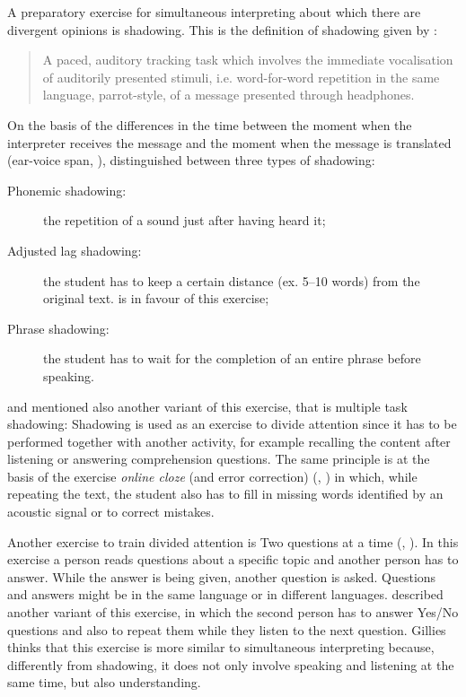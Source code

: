 \documentclass[output=paper]{../langscibook}
\begin{document}
A preparatory exercise for simultaneous interpreting about which there are divergent opinions is shadowing. This is the definition of shadowing given by \citet{Lambert1988}:

\begin{quote}
A paced, auditory tracking task which involves the immediate vocalisation of auditorily presented stimuli, i.e. word-for-word repetition in the same language, parrot-style, of a message presented through headphones. \citep[381]{Lambert1988}
\end{quote}

On the basis of the differences in the time between the moment when the interpreter receives the message and the moment when the message is translated (ear-voice span, \citealt{Goldman-Eisler1972}), \citet{AndresBodenFuchs2015} distinguished between three types of shadowing:

\begin{description}
\item[Phonemic shadowing:] the repetition of a sound just after having heard it;
\item[Adjusted lag shadowing:] \sloppy the student has to keep a certain distance (ex. 5--10 words) from the original text. \citet{PadillaBenitez2002} is in favour of this exercise;
\item[Phrase shadowing:] the student has to wait for the completion of an entire phrase before speaking.
\end{description}

\citet{Schewda_Nicholson1990} and \citet{TonelliRiccardi1995} mentioned also another variant of this exercise, that is multiple task shadowing: Shadowing is used as an exercise to divide attention since it has to be performed together with another activity, for example recalling the content after listening or answering comprehension questions. The same principle is at the basis of the exercise \emph{online cloze} (and error correction) (\citealt{Kalina1992}, \citealt{SettonDawrant2016b}) in which, while repeating the text, the student also has to fill in missing words identified by an acoustic signal or to correct mistakes.

Another exercise to train divided attention is Two questions at a time (\citealt{Kalina1992}, \citealt{Gillies2013}). In this exercise a person reads questions about a specific topic and another person has to answer. While the answer is being given, another question is asked. Questions and answers might be in the same language or in different languages. \citet{Gillies2013} described another variant of this exercise, in which the second person has to answer Yes/No questions and also to repeat them while they listen to the next question. Gillies thinks that this exercise is more similar to simultaneous interpreting because, differently from shadowing, it does not only involve speaking and listening at the same time, but also understanding.
\end{document}
